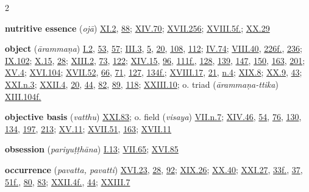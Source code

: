 \begin{multicols}{2}
\begin{vismHanging}
\par\textbf{nutritive essence} (\emph{ojā}) \hyperlink{XI.2}{XI.2}{}, \hyperlink{XI.88}{88}{}; \hyperlink{XIV.70}{XIV.70}{}; \hyperlink{XVII.256}{XVII.256}{}; \hyperlink{XVIII.5}{XVIII.5f.}{}; \hyperlink{XX.29}{XX.29}{}
\par\textbf{object} (\emph{ārammaṇa}) \hyperlink{I.2}{I.2}{}, \hyperlink{I.53}{53}{}, \hyperlink{I.57}{57}{}; \hyperlink{III.3}{III.3}{}, \hyperlink{III.5}{5}{}, \hyperlink{III.20}{20}{}, \hyperlink{III.108}{108}{}, \hyperlink{III.112}{112}{}; \hyperlink{IV.74}{IV.74}{}; \hyperlink{VIII.40}{VIII.40}{}, \hyperlink{VIII.226}{226f.}{}, \hyperlink{VIII.236}{236}{}; \hyperlink{IX.102}{IX.102}{}; \hyperlink{X.15}{X.15}{}, \hyperlink{X.28}{28}{}; \hyperlink{XIII.2}{XIII.2}{}, \hyperlink{XIII.73}{73}{}, \hyperlink{XIII.122}{122}{}; \hyperlink{XIV.15}{XIV.15}{}, \hyperlink{XIV.96}{96}{}, \hyperlink{XIV.111}{111f.}{}, \hyperlink{XIV.128}{128}{}, \hyperlink{XIV.139}{139}{}, \hyperlink{XIV.147}{147}{}, \hyperlink{XIV.150}{150}{}, \hyperlink{XIV.163}{163}{}, \hyperlink{XIV.201}{201}{}; \hyperlink{XV.4}{XV.4}{}; \hyperlink{XVI.104}{XVI.104}{}; \hyperlink{XVII.52}{XVII.52}{}, \hyperlink{XVII.66}{66}{}, \hyperlink{XVII.71}{71}{}, \hyperlink{XVII.127}{127}{}, \hyperlink{XVII.134}{134f.}{}; \hyperlink{XVIII.17}{XVIII.17}{}, \hyperlink{XVIII.21}{21}{}, \hyperlink{XVIII.n4}{n.4}{}; \hyperlink{XIX.8}{XIX.8}{}; \hyperlink{XX.9}{XX.9}{}, \hyperlink{XX.43}{43}{}; \hyperlink{XXI.n3}{XXI.n.3}{}; \hyperlink{XXII.4}{XXII.4}{}, \hyperlink{XXII.20}{20}{}, \hyperlink{XXII.44}{44}{}, \hyperlink{XXII.82}{82}{}, \hyperlink{XXII.89}{89}{}, \hyperlink{XXII.118}{118}{}; \hyperlink{XXIII.10}{XXIII.10}{}; o. triad (\emph{ārammaṇa-ttika}) \hyperlink{XIII.104}{XIII.104f.}{}
\par\textbf{objective basis} (\emph{vatthu}) \hyperlink{XXI.83}{XXI.83}{}; o. field (\emph{visaya}) \hyperlink{VII.n7}{VII.n.7}{}; \hyperlink{XIV.46}{XIV.46}{}, \hyperlink{XIV.54}{54}{}, \hyperlink{XIV.76}{76}{}, \hyperlink{XIV.130}{130}{}, \hyperlink{XIV.134}{134}{}, \hyperlink{XIV.197}{197}{}, \hyperlink{XIV.213}{213}{}; \hyperlink{XV.11}{XV.11}{}; \hyperlink{XVII.51}{XVII.51}{}, \hyperlink{XVII.163}{163}{}; \hyperlink{XVII.11}{XVII.11}{}
\par\textbf{obsession} (\emph{pariyuṭṭhāna}) \hyperlink{I.13}{I.13}{}; \hyperlink{VII.65}{VII.65}{}; \hyperlink{XVI.85}{XVI.85}{}
\par\textbf{occurrence} (\emph{pavatta, pavatti}) \hyperlink{XVI.23}{XVI.23}{}, \hyperlink{XVI.28}{28}{}, \hyperlink{XVI.92}{92}{}; \hyperlink{XIX.26}{XIX.26}{}; \hyperlink{XX.40}{XX.40}{}; \hyperlink{XXI.27}{XXI.27}{}, \hyperlink{XXI.33}{33f.}{}, \hyperlink{XXI.37}{37}{}, \hyperlink{XXI.51}{51f.}{}, \hyperlink{XXI.80}{80}{}, \hyperlink{XXI.83}{83}{}; \hyperlink{XXII.4}{XXII.4f.}{}, \hyperlink{XXII.44}{44}{}; \hyperlink{XXIII.7}{XXIII.7}{}

\end{vismHanging}
\end{multicols}
